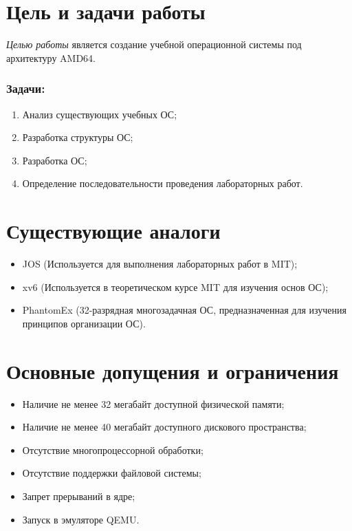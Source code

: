 \documentclass[12pt]{article}
\begin{document}
\TitleSlide

\section{\textbf{Цель и задачи работы}}
\emph{Целью работы} является создание учебной операционной системы под архитектуру AMD64.

\subsubsection{Задачи:}
\begin{enumerate}
\item Анализ существующих учебных ОС;
\item Разработка структуры ОС;
\item Разработка ОС;
\item Определение последовательности проведения лабораторных работ.
\end{enumerate}


\section{\textbf{Существующие аналоги}}
\begin{itemize}
	\item JOS (Используется для выполнения лабораторных работ в MIT);
	\item xv6 (Используется в теоретическом курсе MIT для изучения основ ОС);
	\item PhantomEx (32-разрядная многозадачная ОС, предназначенная для изучения
принципов организации ОС).
\end{itemize}


\section{\textbf{Основные допущения и ограничения}}
\begin{itemize}
\item Наличие не менее 32 мегабайт доступной физической памяти;
\item Наличие не менее 40 мегабайт доступного дискового пространства;
\item Отсутствие многопроцессорной обработки;
\item Отсутствие поддержки файловой системы;
\item Запрет прерываний в ядре;
\item Запуск в эмуляторе QEMU.
\end{itemize}
\end{document}
